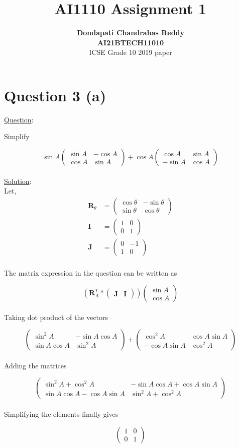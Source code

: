 \documentclass[journal,12pt,twocolumn]{IEEEtran}
\newcommand{\myvec}[1]{\ensuremath{\begin{pmatrix}#1\end{pmatrix}}}
\let\vec\mathbf
\begin{document}
\title{\textbf{AI1110 Assignment 1} }
\author{\textbf{Dondapati Chandrahas Reddy}\\ \textbf{AI21BTECH11010}\\ ICSE Grade 10 2019 paper}

\maketitle

{\section {Question 3 (a) \newline}}

{\large \underline{Question}:\newline}

Simplify

\begin{equation}
	\sin A\myvec{\sin A &  -\cos A \\ \cos A & \sin A} + \cos A \myvec{\cos A &  \sin A \\ -\sin A & \cos A}
\end{equation}\\

{\large \underline{Solution}:}\\

Let,
\begin{align}
	\vec{R}_\theta &= \myvec{\cos \theta &  -\sin \theta \\ \sin \theta & \cos \theta} \\[1em] \vec{I} &= \myvec{1 & 0 \\ 0 & 1} \\[1em] \vec{J} &= \myvec{0 & -1 \\ 1 & 0}
\end{align}\\

The matrix expression in the question can be written as

\begin{equation}
	\left(\vec{R}_A^T * \myvec{\vec{J} & \vec{I}}\right) \myvec{\sin A \\ \cos A}
\end{equation}\\

Taking dot product of the vectors

\begin{equation}
	\myvec{\sin^2 A &  -\sin A\cos A \\ \sin A\cos A & \sin^2 A} +\myvec{\cos^2 A & \cos A\sin A \\ -\cos A\sin A & \cos^2 A}
\end{equation}\\

Adding the matrices

\begin{equation}
	\myvec{\sin^2 A + \cos^2 A &  -\sin A \cos A +\cos A \sin A \\ \sin A \cos A -\cos A \sin A & \sin^2 A + \cos^2 A}
\end{equation}\\

Simplifying the elements finally gives

\begin{equation}
	\myvec{1 & 0 \\ 0 & 1}
\end{equation}\\
\end{document}
